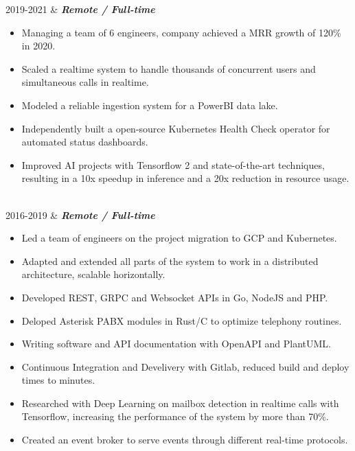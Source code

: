 \documentclass[]{cv-mauri}
\begin{document}
\begin{tabularcv}
    2019-2021   &   
                    \textbf{\textit{Remote / Full-time}}
            \begin{itemize}
            	\item Managing a team of 6 engineers, company achieved a MRR growth of 120\% in 2020.
            	\item Scaled a realtime system to handle thousands of concurrent users and simultaneous calls in realtime.
            	\item Modeled a reliable ingestion system for a PowerBI data lake.
            	\item Independently built a open-source Kubernetes Health Check operator for automated status dashboards.
            	\item Improved AI projects with Tensorflow 2 and state-of-the-art techniques, resulting in a 10x speedup in inference and a 20x reduction in resource usage. 
            \end{itemize}
                    \\[\vspacepar]

    2016-2019   &   
		    		\textbf{\textit{Remote / Full-time}}
		    \begin{itemize}
		    	\item Led a team of engineers on the project migration to GCP and Kubernetes.
		    	\item Adapted and extended all parts of the system to work in a distributed architecture, scalable horizontally.
		    	\item Developed REST, GRPC and Websocket APIs in Go, NodeJS and PHP.
		    	\item Deloped Asterisk PABX modules in Rust/C to optimize telephony routines.
		    	\item Writing software and API documentation with OpenAPI and PlantUML.
		    	\item Continuous Integration and Develivery with Gitlab, reduced build and deploy times to minutes.
		    	\item Researched with Deep Learning on mailbox detection in realtime calls with Tensorflow, increasing the performance of the system by more than 70\%.
		    	\item Created an event broker to serve events through different real-time protocols.
			\end{itemize}


\end{tabularcv}
\end{document}
